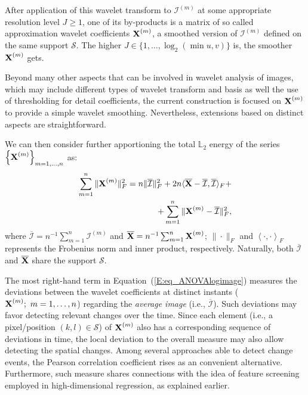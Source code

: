 \documentclass[journal]{IEEEtran}
\newcommand{\vX}{{\textbf X}}
\begin{document}
After application of this wavelet transform to $\mathcal{I}^{(m)}$ at some appropriate resolution level $J\geq 1$, one of its by-products is a matrix of so called approximation wavelet coefficients $\vX^{(m)}$, a smoothed version of $\mathcal{I}^{(m)}$ 
defined on the same support $\mathcal{S}$. The higher $J\in\{1,\ldots,\log_2( \min{u,v} )\}$ is, the smoother $\vX^{(m)}$ gets.

Beyond many other aspects that can be involved in wavelet analysis of images, which may include different types of wavelet transform and basis as well the use of thresholding for detail coefficients, the current construction is focused on $\vX^{(m)}$ to provide a simple wavelet smoothing. Nevertheless, extensions based on distinct aspects are straightforward.

We can then consider further apportioning the total $\mathbb{L}_2$ energy of the series $\left\{\vX^{(m)}\right\}_{m=1,\ldots,n}$ as:
\begin{equation}\label{E:eq_ANOVAlogimage}
\begin{split}
\sum_{m=1}^n\|\vX^{(m)}\|_F^2
= n\|\overline{\mathcal{I}}\|_F^2 + 2n\langle\overline{\vX}-\overline{\mathcal{I}},\overline{\mathcal{I}}\rangle_F + \\
+ \sum_{m=1}^n\|\mathcal \vX^{(m)} - \overline{\mathcal{I}}\|_F^2,
\end{split}
\end{equation}
where $\overline{\mathcal{I}}=n^{-1}\sum_{m=1}^n\mathcal{I}^{(m)}$ and $\overline{\vX}=n^{-1}\sum_{m=1}^n\vX^{(m)}$; $\| \cdot \|_F$ and $\left\langle \cdot , \cdot \right\rangle_F$ represents the Frobenius norm and inner product, respectively. Naturally, both $\overline{\mathcal{I}}$ and $\overline{\vX}$ share the support $\mathcal{S}$.


The most right-hand term in Equation~(\ref{E:eq_ANOVAlogimage}) measures the deviations 
between the wavelet coefficients at distinct instants ($\vX^{(m)}; \ m=1,\ldots,n$) regarding the \textit{average image} (i.e., $\overline{\mathcal{I}}$). Such deviations may favor detecting relevant changes over the time. Since each element (i.e., a pixel/position $(k,l)\in \mathcal{S}$) of $\vX^{(m)}$ also has a corresponding sequence of deviations in time, the local deviation to the overall measure 
may also allow detecting the spatial changes. Among several approaches able to detect change events, the Pearson correlation coefficient rises as an convenient alternative. Furthermore, such measure shares connections with the idea of feature screening employed in high-dimensional regression, as explained earlier.
\end{document}
